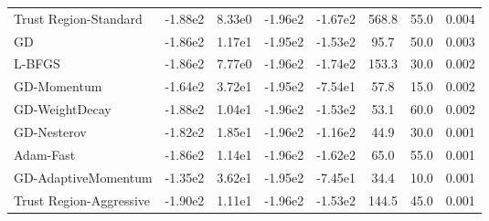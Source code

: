 \documentclass{article}
\begin{document}
\begin{table}[htbp]
{\begin{tabular}{p{2.5cm}*{7}{c}}
Trust Region-Standard & -1.88e2 & 8.33e0 & -1.96e2 & -1.67e2 & 568.8 & 55.0 & 0.004 \\
GD & -1.86e2 & 1.17e1 & -1.95e2 & -1.53e2 & 95.7 & 50.0 & 0.003 \\
L-BFGS & -1.86e2 & 7.77e0 & -1.96e2 & -1.74e2 & 153.3 & 30.0 & 0.002 \\
GD-Momentum & -1.64e2 & 3.72e1 & -1.95e2 & -7.54e1 & 57.8 & 15.0 & 0.002 \\
GD-WeightDecay & -1.88e2 & 1.04e1 & -1.96e2 & -1.53e2 & 53.1 & 60.0 & 0.002 \\
GD-Nesterov & -1.82e2 & 1.85e1 & -1.96e2 & -1.16e2 & 44.9 & 30.0 & 0.001 \\
Adam-Fast & -1.86e2 & 1.14e1 & -1.96e2 & -1.62e2 & 65.0 & 55.0 & 0.001 \\
GD-AdaptiveMomentum & -1.35e2 & 3.62e1 & -1.95e2 & -7.45e1 & 34.4 & 10.0 & 0.001 \\
Trust Region-Aggressive & -1.90e2 & 1.11e1 & -1.96e2 & -1.53e2 & 144.5 & 45.0 & 0.001 \\
\bottomrule
\end{tabular}
}
\end{table}
\end{document}
